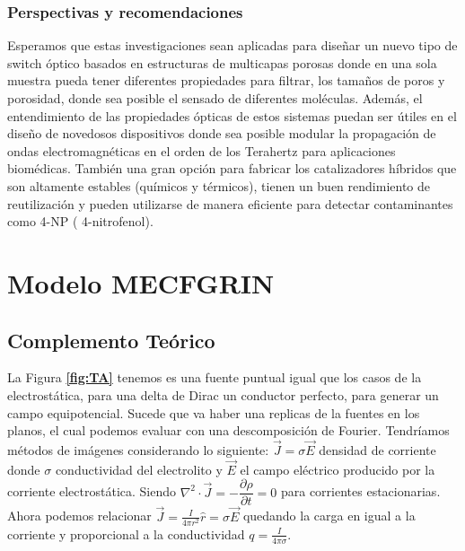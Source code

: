 \documentclass[a4paper,11pt,]{book}
\begin{document}
\subsection{Perspectivas y recomendaciones}
Esperamos que estas investigaciones sean aplicadas para diseñar un nuevo tipo de switch óptico basados en estructuras de multicapas porosas donde en una sola muestra pueda tener diferentes propiedades para filtrar, los tamaños de poros y porosidad, donde sea posible el sensado de diferentes moléculas. Además, el entendimiento de las propiedades ópticas de estos sistemas puedan ser útiles en el diseño de novedosos dispositivos donde sea posible modular la propagación de ondas electromagnéticas en el orden de los Terahertz para aplicaciones biomédicas. También una gran opción para fabricar  los catalizadores híbridos que  son altamente estables (químicos y térmicos), tienen un buen rendimiento de reutilización y pueden utilizarse de manera eficiente para detectar contaminantes como  4-NP ( 4-nitrofenol). 
\newpage


\appendix %


%
%
%

\chapter{Modelo MECFGRIN}\label{aped.A}
\section{Complemento Teórico }


La Figura \textbf{\ref{fig:TA}}   tenemos es una fuente puntual igual que los casos de la electrostática, para una delta de Dirac un conductor perfecto, para generar un campo equipotencial. Sucede que va haber una replicas de la fuentes en los planos, el cual podemos evaluar con una descomposición de Fourier. Tendríamos métodos de imágenes  considerando lo siguiente: $\vec{J}=\sigma \vec{E}$ densidad de corriente donde $\sigma$ conductividad del electrolito y $\vec{E}$ el campo eléctrico producido por la corriente electrostática. Siendo $\nabla^2 \cdot \vec{J}= -\dfrac{\partial \rho}{\partial t}=0$ para corrientes estacionarias.
Ahora podemos relacionar $\vec{J}= \frac{I}{4\pi r^2}\hat{r}=\sigma \vec{E}$ quedando la carga en igual a la corriente y proporcional a la conductividad $q = \frac{I}{4\pi \sigma}$.
\end{document}
